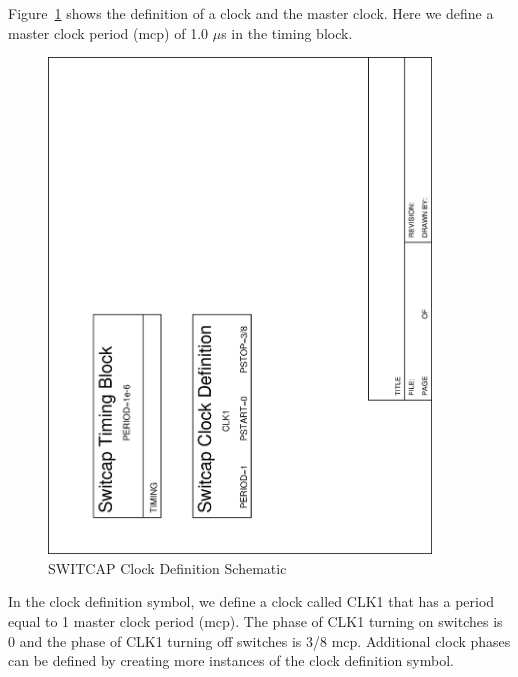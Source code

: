 \documentclass{article}
\begin{document}
Figure~\ref{fig:clocks} shows the definition of a clock and the master
clock.  Here we define a master clock period (mcp) of 1.0 $\mu$s in
the timing block.  
\begin{figure}
\begin{center}
\includegraphics[angle=270,width=4in]{clocks.eps}
\end{center}
\caption{SWITCAP Clock Definition Schematic}
\label{fig:clocks}
\end{figure}
In the clock definition symbol, we define a clock called CLK1 that has
a period equal to 1 master clock period (mcp).  The phase of CLK1
turning on switches is 0 and the phase of CLK1 turning off switches is
3/8 mcp.  Additional clock phases can be defined by creating more
instances of the clock definition symbol.
\end{document}

